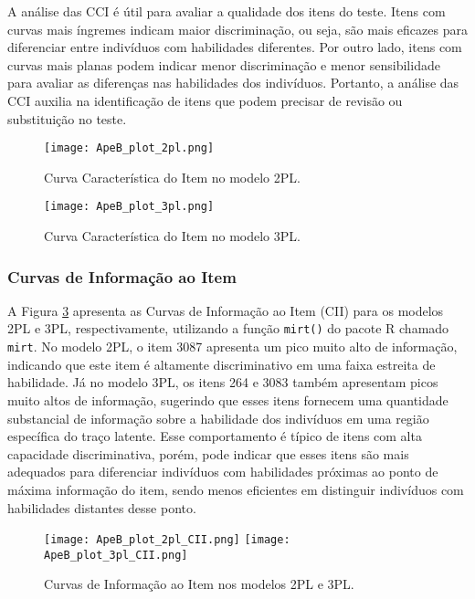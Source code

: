 A análise das CCI é útil para avaliar a qualidade dos itens do teste. Itens com curvas mais íngremes indicam maior discriminação, ou seja, são mais eficazes para diferenciar entre indivíduos com habilidades diferentes. Por outro lado, itens com curvas mais planas podem indicar menor discriminação e menor sensibilidade para avaliar as diferenças nas habilidades dos indivíduos. Portanto, a análise das CCI auxilia na identificação de itens que podem precisar de revisão ou substituição no teste.

\begin{figure}[!ht]
\centering
\texttt{[image: ApeB\_plot\_2pl.png]}
\caption{Curva Característica do Item no modelo 2PL.}
\label{fig:ApeB_plot_2pl}
\end{figure}

\begin{figure}[!ht]
\centering
\texttt{[image: ApeB\_plot\_3pl.png]}
\caption{Curva Característica do Item no modelo 3PL.}
\label{fig:ApeB_plot_3pl}
\end{figure}


\subsubsection{Curvas de Informação ao Item}\label{sec:apeB_cci}

A Figura \ref{fig:ApeB_plot_CII} apresenta as Curvas de Informação ao Item (CII) para os modelos 2PL e 3PL, respectivamente, utilizando a função \verb|mirt()| do pacote R chamado \verb|mirt|. No modelo 2PL, o item 3087 apresenta um pico muito alto de informação, indicando que este item é altamente discriminativo em uma faixa estreita de habilidade. Já no modelo 3PL, os itens 264 e 3083 também apresentam picos muito altos de informação, sugerindo que esses itens fornecem uma quantidade substancial de informação sobre a habilidade dos indivíduos em uma região específica do traço latente. Esse comportamento é típico de itens com alta capacidade discriminativa, porém, pode indicar que esses itens são mais adequados para diferenciar indivíduos com habilidades próximas ao ponto de máxima informação do item, sendo menos eficientes em distinguir indivíduos com habilidades distantes desse ponto.

\begin{figure}[!ht]
\centering
\texttt{[image: ApeB\_plot\_2pl\_CII.png]}
\texttt{[image: ApeB\_plot\_3pl\_CII.png]}
\caption{Curvas de Informação ao Item nos modelos 2PL e 3PL.}
\label{fig:ApeB_plot_CII}
\end{figure}

